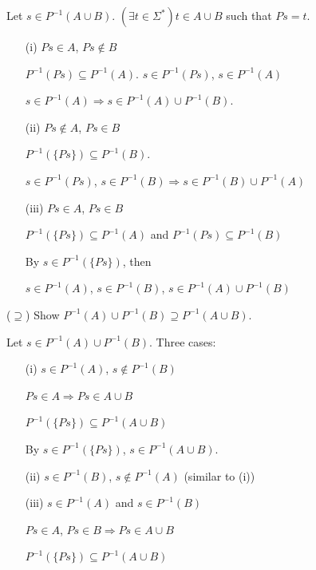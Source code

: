 \documentclass{article}
\begin{document}
\begin{enumerate}
\begin{enumerate}
    Let $s \in P^{-1}(A \cup B)$. $(\exists t \in \Sigma^*) t \in A \cup B$ such that $Ps = t$.
    
    \begin{itemize}
      \item[(i)] $Ps \in A$, $Ps \notin B$
      
      $P^{-1}(Ps) \subseteq P^{-1}(A)$. $s \in P^{-1}(Ps)$, $s \in P^{-1}(A)$

      $s \in P^{-1}(A) \Rightarrow s \in P^{-1}(A) \cup P^{-1}(B)$.

      \item[(ii)] $Ps \notin A$, $Ps \in B$
      
      $P^{-1}(\{Ps\}) \subseteq P^{-1}(B)$.
      
      $s \in P^{-1}(Ps)$, $s \in P^{-1}(B) \Rightarrow s \in P^{-1}(B) \cup P^{-1}(A)$

      \item[(iii)] $Ps \in A$, $Ps \in B$
      
      $P^{-1}(\{Ps\}) \subseteq P^{-1}(A)$ and $P^{-1}(Ps) \subseteq P^{-1}(B)$

      By $s \in P^{-1}(\{Ps\})$, then

      $s \in P^{-1}(A)$, $s \in P^{-1}(B)$, $s \in P^{-1}(A) \cup P^{-1}(B)$ 

    \end{itemize}

    ($\supseteq$) Show $P^{-1}(A) \cup P^{-1}(B) \supseteq P^{-1}(A \cup B)$.

    Let $s \in P^{-1}(A) \cup P^{-1}(B)$. Three cases:

    \begin{itemize}
      \item[(i)] $s \in P^{-1}(A)$, $s \notin P^{-1}(B)$
      
      $Ps \in A \Rightarrow Ps \in A \cup B$

      $P^{-1}(\{Ps\}) \subseteq P^{-1}(A \cup B)$

      By $s \in P^{-1}(\{Ps\})$, $s \in P^{-1}(A \cup B)$.

      \item[(ii)] $s \in P^{-1}(B)$, $s \notin P^{-1}(A)$ (similar to (i))
      
      \item[(iii)] $s \in P^{-1}(A)$ and $s \in P^{-1}(B)$
      
      $Ps \in A$, $Ps \in B \Rightarrow Ps \in A \cup B$

      $P^{-1}(\{Ps\}) \subseteq P^{-1}(A \cup B)$


\end{itemize}
\end{enumerate}
\end{enumerate}
\end{document}
